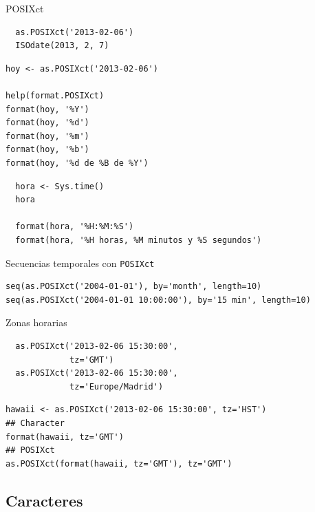 \documentclass[xcolor={usenames,svgnames,dvipsnames}]{beamer}
\begin{document}
\begin{frame}[fragile,label=sec-5-2-3]{POSIXct}
 \lstset{language=R,label= ,caption= ,numbers=none}
\begin{lstlisting}
  as.POSIXct('2013-02-06')
  ISOdate(2013, 2, 7)
\end{lstlisting}

\lstset{language=R,label= ,caption= ,numbers=none}
\begin{lstlisting}
hoy <- as.POSIXct('2013-02-06')

help(format.POSIXct)
format(hoy, '%Y')
format(hoy, '%d')
format(hoy, '%m')
format(hoy, '%b')
format(hoy, '%d de %B de %Y')
\end{lstlisting}

\lstset{language=R,label= ,caption= ,numbers=none}
\begin{lstlisting}
  hora <- Sys.time()
  hora
  
  format(hora, '%H:%M:%S')
  format(hora, '%H horas, %M minutos y %S segundos')
\end{lstlisting}
\end{frame}

\begin{frame}[fragile,label=sec-5-2-4]{Secuencias temporales con \texttt{POSIXct}}
 \lstset{language=R,label= ,caption= ,numbers=none}
\begin{lstlisting}
seq(as.POSIXct('2004-01-01'), by='month', length=10)
seq(as.POSIXct('2004-01-01 10:00:00'), by='15 min', length=10)
\end{lstlisting}
\end{frame}

\begin{frame}[fragile,label=sec-5-2-5]{Zonas horarias}
 \lstset{language=R,label= ,caption= ,numbers=none}
\begin{lstlisting}
  as.POSIXct('2013-02-06 15:30:00',
             tz='GMT')
  as.POSIXct('2013-02-06 15:30:00',
             tz='Europe/Madrid')
\end{lstlisting}

\lstset{language=R,label= ,caption= ,numbers=none}
\begin{lstlisting}
hawaii <- as.POSIXct('2013-02-06 15:30:00', tz='HST')
## Character
format(hawaii, tz='GMT')
## POSIXct
as.POSIXct(format(hawaii, tz='GMT'), tz='GMT')
\end{lstlisting}
\end{frame}

\subsection{Caracteres}
\label{sec-5-3}
\end{document}
